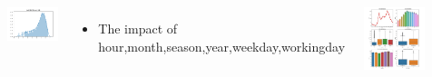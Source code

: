 \documentclass{tikzposter} %
\begin{document}
\begin{columns}
{\begin{minipage}{0.33\linewidth}
        \centering
        \includegraphics[width=1\textwidth]{pic1/log.png} 
    \end{minipage}
    \begin{itemize}                            
        \item
        The impact of hour,month,season,year,weekday,workingday
    \end{itemize}
    \begin{minipage}{1\linewidth}
        \centering
        \includegraphics[width=0.6\textwidth]{pic1/count all.png} 
    \end{minipage}
}




\end{columns}
\end{document}
